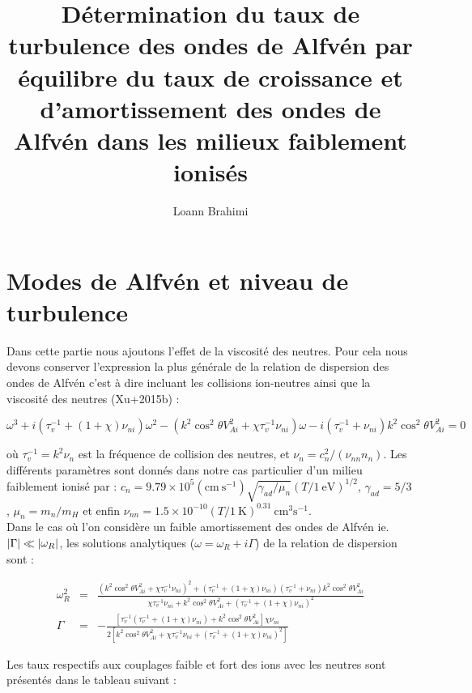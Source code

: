 \documentclass[10pt,a4paper]{article}
\author{Loann Brahimi}
\title{Détermination du taux de turbulence des ondes de Alfvén par équilibre du taux de croissance et d'amortissement des ondes de Alfvén dans les milieux faiblement ionisés}
\begin{document}
\maketitle

\section{Modes de Alfvén et niveau de turbulence}

Dans cette partie nous ajoutons l'effet de la viscosité des neutres. Pour cela nous devons conserver l'expression la plus générale de la relation de dispersion des ondes de Alfvén c'est à dire incluant les collisions ion-neutres ainsi que la viscosité des neutres (Xu+2015b) : 

\begin{equation}
	\omega^3 + i (\tau_v^{-1} + (1 + \chi)\nu_{ni}) \omega^2 - (k^2\cos^2\theta V_{Ai}^2 + \chi \tau_v^{-1} \nu_{ni})\omega - i(\tau_v^{-1} + \nu_{ni}) k^2 \cos^2\theta V_{Ai}^2 = 0
\end{equation}

où $\tau_v^{-1} = k^2 \nu_n$ est la fréquence de collision des neutres, et $\nu_n = c_n^2 / (\nu_{nn} n_n)$. Les différents paramètres sont donnés dans notre cas particulier d'un milieu faiblement ionisé par : $c_n = 9.79\times 10^5 (\mathrm{cm}~\mathrm{s}^{-1}) \sqrt{\gamma_{ad}/\mu_n} (T / 1~\mathrm{eV})^{1/2}$, $\gamma_{ad} = 5/3$, $\mu_n = m_n / m_H$ et enfin $\nu_{nn} = 1.5 \times 10^{-10} (T/ 1~\mathrm{K})^{0.31} ~ \mathrm{cm}^3\mathrm{s}^{-1}$. \\ 

Dans le cas où l'on considère un faible amortissement des ondes de Alfvén ie. $\abs{\Gamma} \ll \abs{\omega_R}$, les solutions analytiques ($\omega = \omega_R + i \Gamma$) de la relation de dispersion sont : 


\begin{eqnarray}
	\omega_R^2 & = & \frac{(k^2\cos^2\theta V_{Ai}^2 + \chi \tau_v^{-1} \nu_{ni})^2 + (\tau_v^{-1} + (1+\chi) \nu_{ni})(\tau_v^{-1}+\nu_{ni}) k^2 \cos^2\theta V_{Ai}^2}{\chi \tau_v^{-1} \nu_{ni} + k^2 \cos^2 \theta V_{Ai}^2 + (\tau_v^{-1} + (1 + \chi) \nu_{ni})^2} \\	
	\Gamma     & = & -\frac{[\tau_v^{-1}(\tau_v^{-1} + (1 + \chi)\nu_{ni}) + k^2 \cos^2 \theta V_{Ai}^2 ] \chi \nu_{ni}}{2 [k^2 \cos^2 \theta V_{Ai}^2 + \chi \tau_v^{-1} \nu_{ni} + (\tau_v^{-1} + (1+\chi)\nu_{ni})^2]} 
\end{eqnarray}

Les taux respectifs aux couplages faible et fort des ions avec les neutres sont présentés dans le tableau suivant : 
 
\end{document}
